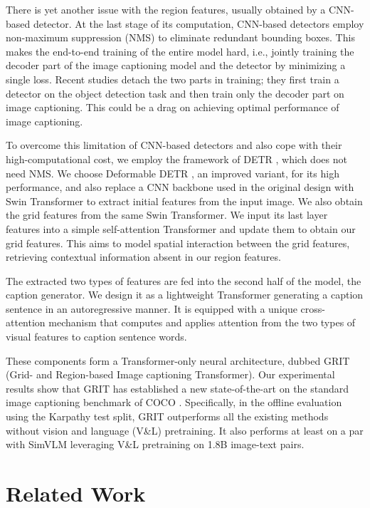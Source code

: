 \documentclass[runningheads]{llncs}
\begin{document}
There is yet another issue with the region features, usually obtained by a CNN-based detector. At the last stage of its computation, CNN-based detectors employ non-maximum suppression (NMS) to eliminate redundant bounding boxes. This makes the end-to-end training of the entire model hard, i.e., jointly training the decoder part of the image captioning model and the detector by minimizing a single loss. Recent studies detach the two parts in training; they first train a detector on the object detection task and then train only the decoder part on image captioning. This could be a drag on achieving optimal performance of image captioning. 

To overcome this limitation of CNN-based detectors and also cope with their high-computational cost, we employ the framework of DETR \cite{carion2020end}, which does not need NMS. We choose Deformable DETR \cite{zhu2021deformable}, an improved variant, for its high performance, and also replace a CNN backbone used in the original design with Swin Transformer \cite{liu2021swin} to extract initial features from the input image. We also obtain the grid features from the same Swin Transformer. We input its last layer features into a simple self-attention Transformer and update them to obtain our grid features. This aims to model spatial interaction between the grid features, retrieving contextual information absent in our region features.

The extracted two types of features are fed into the second half of the model, the caption generator. We design it as a lightweight Transformer generating a caption sentence in an autoregressive manner. It is equipped with a unique cross-attention mechanism that computes and applies attention from the two types of visual features to caption sentence words. 

These components form a Transformer-only neural architecture, dubbed GRIT (Grid- and Region-based Image captioning Transformer). 
Our experimental results show that GRIT has established a new state-of-the-art on the standard image captioning benchmark of COCO \cite{lin2014microsoft}. Specifically, in the offline evaluation using the Karpathy test split, GRIT outperforms all the existing methods without vision and language (V\&L) pretraining. It also performs at least on a par with SimVLM \cite{wang2021simvlm} leveraging V\&L pretraining on 1.8B image-text pairs.


\section{Related Work}
\end{document}
